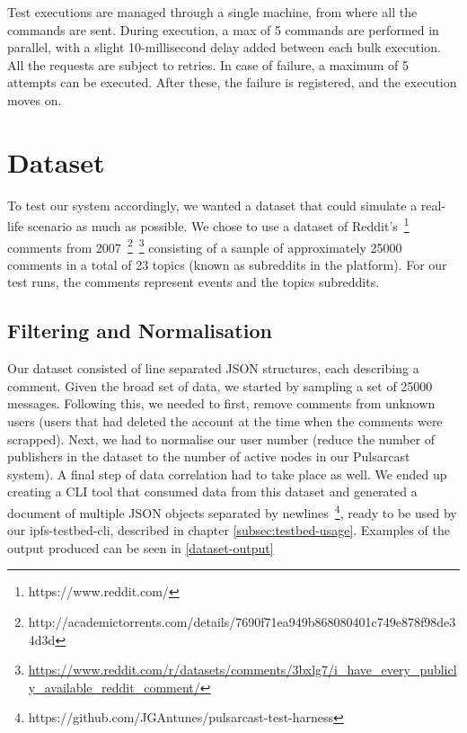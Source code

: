 Test executions are managed through a single machine, from where all the
commands are sent. During execution, a max of 5 commands are performed in
parallel, with a slight 10-millisecond delay added between each bulk execution.
All the requests are subject to retries. In case of failure, a maximum of 5
attempts can be executed. After these, the failure is registered, and the
execution moves on.

\section{Dataset}\label{dataset}

To test our system accordingly, we wanted a dataset that could simulate a
real-life scenario as much as possible. We chose to use a dataset of
Reddit's~\footnote{https://www.reddit.com/} comments from
2007~\footnote{http://academictorrents.com/details/7690f71ea949b868080401c749e878f98de34d3d}~\footnote{\url{https://www.reddit.com/r/datasets/comments/3bxlg7/i_have_every_publicly_available_reddit_comment/}}
consisting of a sample of approximately 25000 comments in a total of 23 topics
(known as subreddits in the platform). For our test runs, the comments
represent events and the topics subreddits.

\subsection{Filtering and Normalisation}\label{subsec:filtering}

Our dataset consisted of line separated JSON structures, each describing a
comment. Given the broad set of data, we started by sampling a set of 25000
messages.  Following this, we needed to first, remove comments from unknown
users (users that had deleted the account at the time when the comments were
scrapped). Next, we had to normalise our user number (reduce the number of
publishers in the dataset to the number of active nodes in our Pulsarcast
system). A final step of data correlation had to take place as well. We ended
up creating a CLI tool that consumed data from this dataset and generated a
document of multiple JSON objects separated by
newlines~\footnote{https://github.com/JGAntunes/pulsarcast-test-harness}, ready
to be used by our ipfs-testbed-cli, described in chapter
\ref{subsec:testbed-usage}. Examples of the output produced can be seen in
\ref{dataset-output}


